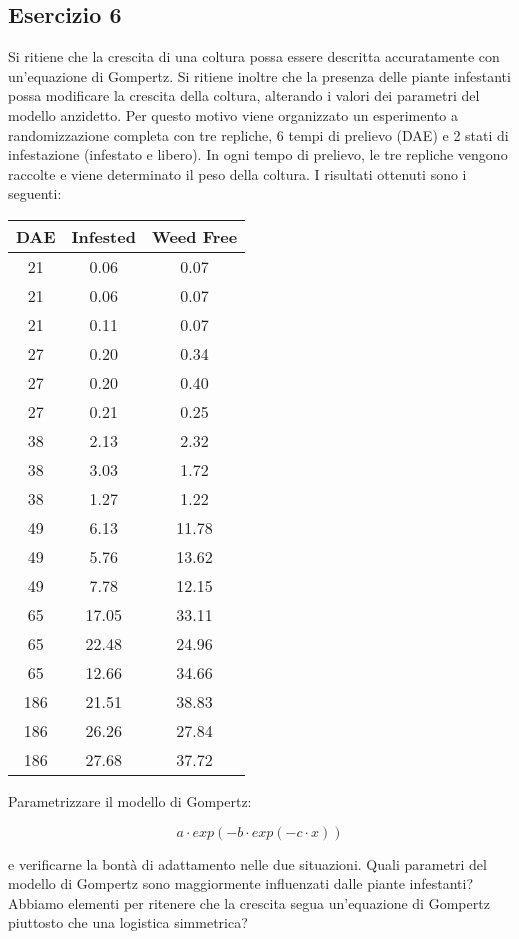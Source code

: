 \documentclass[a4paper,12pt,oneside]{book}
\begin{document}
\hypertarget{esercizio-6-3}{%
\subsection{Esercizio 6}\label{esercizio-6-3}}

Si ritiene che la crescita di una coltura possa essere descritta accuratamente con un'equazione di Gompertz. Si ritiene inoltre che la presenza delle piante infestanti possa modificare la crescita della coltura, alterando i valori dei parametri del modello anzidetto. Per questo motivo viene organizzato un esperimento a randomizzazione completa con tre repliche, 6 tempi di prelievo (DAE) e 2 stati di infestazione (infestato e libero). In ogni tempo di prelievo, le tre repliche vengono raccolte e viene determinato il peso della coltura. I risultati ottenuti sono i seguenti:

\begin{longtable}[]{@{}ccc@{}}
\toprule
DAE & Infested & Weed Free \\
\midrule
\endhead
21 & 0.06 & 0.07 \\
21 & 0.06 & 0.07 \\
21 & 0.11 & 0.07 \\
27 & 0.20 & 0.34 \\
27 & 0.20 & 0.40 \\
27 & 0.21 & 0.25 \\
38 & 2.13 & 2.32 \\
38 & 3.03 & 1.72 \\
38 & 1.27 & 1.22 \\
49 & 6.13 & 11.78 \\
49 & 5.76 & 13.62 \\
49 & 7.78 & 12.15 \\
65 & 17.05 & 33.11 \\
65 & 22.48 & 24.96 \\
65 & 12.66 & 34.66 \\
186 & 21.51 & 38.83 \\
186 & 26.26 & 27.84 \\
186 & 27.68 & 37.72 \\
\bottomrule
\end{longtable}

Parametrizzare il modello di Gompertz:

\[a \cdot exp(-b \cdot exp(-c \cdot x))\]

e verificarne la bontà di adattamento nelle due situazioni. Quali parametri del modello di Gompertz sono maggiormente influenzati dalle piante infestanti? Abbiamo elementi per ritenere che la crescita segua un'equazione di Gompertz piuttosto che una logistica simmetrica?
\end{document}
